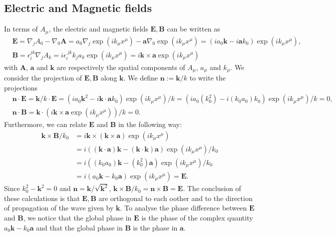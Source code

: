 \documentclass[10pt, a4paper]{article}
\begin{document}
{\subsection{Electric and Magnetic fields}
In terms of $A_\mu$, the electric and magnetic fields $\mathbf{E}, \mathbf{B}$ can be written as 
\begin{align*}
    &\mathbf{E} = \nabla_j A_0 -\nabla_0 \mathbf{A} = a_0\nabla_j\exp \left(i k_\mu x^\mu\right) - \mathbf{a} \nabla_0  \exp \left(i k_\mu x^\mu\right) = (i a_0 \mathbf{k} - i\mathbf{a} k_0)  \exp \left(i k_\mu x^\mu\right),\\
    &\mathbf{B} =  \epsilon_i^{jk} \nabla_j A_{k} = i\epsilon_i^{\ jk} k_j a_k\exp \left(i k_\mu x^\mu\right) = i\mathbf{k} \times \mathbf{a}\exp \left(i k_\mu x^\mu\right) 
\end{align*} with $\mathbf{A}$, $\mathbf{a}$ and $\mathbf{k}$ are respectively the spatial components of $A_{\mu}$, $a_{\mu}$ and $k_{\mu}$. We consider the projection of $\mathbf{E}, \mathbf{B}$ along $\mathbf{k}$. We define  $\mathbf{n} := \mathbf{k}/k$ to write the projections 
\begin{align*}
    &\mathbf{n} \cdot \mathbf{E} = \mathbf{k}/k \cdot \mathbf{E}= (i a_0 \mathbf{k}^2 - i\mathbf{k} \cdot \mathbf{a} k_0)  \exp \left(i k_\mu x^\mu\right)/k =  (i a_0 (k_0^2) - i(k_0 a_0) k_0)  \exp \left(i k_\mu x^\mu\right)/k = 0, \\
    &\mathbf{n} \cdot \mathbf{B} = \mathbf{k} \cdot \left(i\mathbf{k} \times \mathbf{a}\exp \left(i k_\mu x^\mu\right)\right)/k = 0.
\end{align*}
Furthermore, we can relate $\mathbf{E}$ and $\mathbf{B}$ in the following way:
\begin{align*}
    \mathbf{k} \times \mathbf{B}/k_0 &= i \mathbf{k} \times (\mathbf{k} \times \mathbf{a})\exp \left(i k_\mu x^\mu\right)\\ &=  i\left((\mathbf{k} \cdot \mathbf{a})\mathbf{k} - (\mathbf{k} \cdot \mathbf{k})\mathbf{a}\right)\exp \left(i k_\mu x^\mu\right)/k_0 \\
    &=  i\left((k_0 a_0)\mathbf{k} - (k_0^2)\mathbf{a}\right)\exp \left(i k_\mu x^\mu\right)/k_0\\
    &= i\left(a_0\mathbf{k} - k_0\mathbf{a}\right)\exp \left(i k_\mu x^\mu\right) = \mathbf{E}.
\end{align*}
Since $k_0^2-\mathbf{k}^2 = 0$ and $\mathbf{n} = \mathbf{k}/\sqrt{\mathbf{k}^2}$, $\mathbf{k} \times \mathbf{B}/k_0 = \mathbf{n} \times \mathbf{B} = \mathbf{E}$. The conclusion of these calculations is that $\mathbf{E}, \mathbf{B}$ are orthogonal to each oother and to the direction of propagation of the wave given by $\mathbf{k}$. To analyse the phase difference between $\mathbf{E
}$ and $\mathbf{B}$,  we notice that the global phase in $\mathbf{E}$ is the phase of the complex quantity $a_0\mathbf{k} - k_0\mathbf{a}$ and that the global phase in $\mathbf{B}$ is the phase in $\mathbf{a}$. 

}
\end{document}
